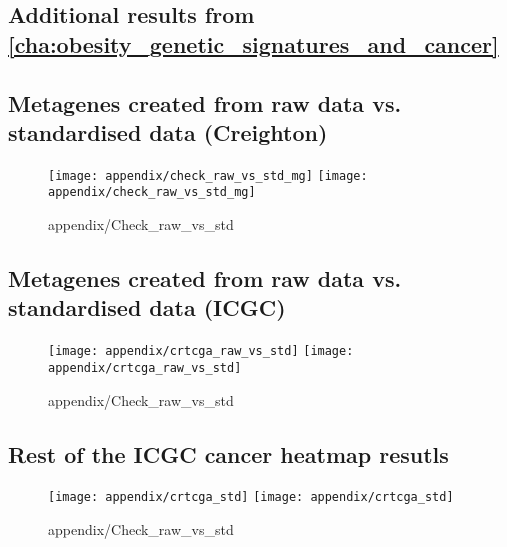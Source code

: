 \begin{appendices}
	\renewcommand{\thesection}{\Alph{chapter}\arabic{section}}
	\chapter{Additional results from \cref{cha:obesity_genetic_signatures_and_cancer}}
	\label{app:a}

	\section{Metagenes created from raw data vs. standardised data (Creighton)}
	\label{sec:metagenes_created_from_raw_data_vs_standardised_data}
	
	\begin{figure}[htpb]
		\centering
		\texttt{[image: appendix/check\_raw\_vs\_std\_mg]}
		\hfill
		\texttt{[image: appendix/check\_raw\_vs\_std\_mg]}
		\caption{appendix/Check_raw_vs_std}
		\label{fig:appendix/check_raw_vs_std}
	\end{figure}
	
	\section{Metagenes created from raw data vs. standardised data (ICGC)}
	\label{sec:metagenes_created_from_raw_data_vs_standardised_data_icgc}

	\begin{figure}[htpb]
		\centering
		\texttt{[image: appendix/crtcga\_raw\_vs\_std]}
		\hfill
		\texttt{[image: appendix/crtcga\_raw\_vs\_std]}
		\caption{appendix/Check_raw_vs_std}
		\label{fig:appendix/check_raw_vs_std}
	\end{figure}

	\section{Rest of the ICGC cancer heatmap resutls}
	\label{sec:rest_of_the_icgc_cancer_heatmap_resutls}
	
	\begin{figure}[htpb]
		\centering
		\texttt{[image: appendix/crtcga\_std]}
		\hfill
		\texttt{[image: appendix/crtcga\_std]}
		\caption{appendix/Check_raw_vs_std}
		\label{fig:appendix/check_raw_vs_std}
	\end{figure}


\end{appendices}
